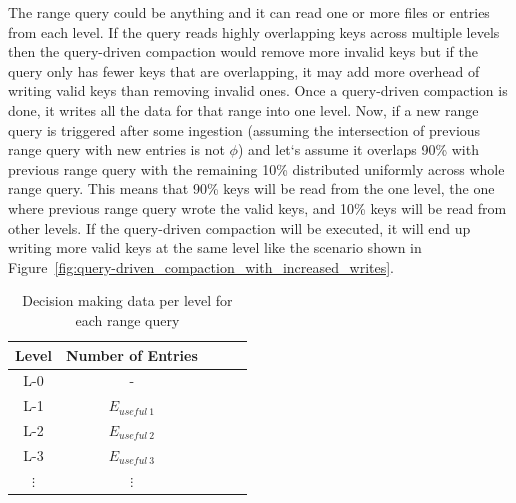 The range query could be anything and it can read one or more files or entries from each level. If the query reads highly
overlapping keys across multiple levels then the query-driven compaction would remove more invalid keys but if the query only 
has fewer keys that are overlapping, it may add more overhead of writing valid keys than removing invalid ones. 
Once a query-driven compaction is done, it writes all the data for that range into one level. Now, if a new range query is 
triggered after some ingestion (assuming the intersection of previous range query with new entries is not $\phi$) and let`s assume it 
overlaps 90\% with previous range query with the remaining 10\% distributed uniformly across whole range query. This means that
90\% keys will be read from the one level, the one where previous range query wrote the valid keys, and 10\% keys will be read 
from other levels. If the query-driven compaction will be executed, it will end up writing more valid keys at the same 
level like the scenario shown in Figure~\ref{fig:query-driven_compaction_with_increased_writes}.



\begin{table}
    \begin{tabular}{|c|c|c|c|c|}
        \hline
        \textbf{Level} & \textbf{Number of Entries} \\
        \hline
        L-0 & \-- \\
        \hline
        L-1 & \textit{$E_{useful\ 1}$} \\
        \hline
        L-2 & \textit{$E_{useful\ 2}$} \\
        \hline
        L-3 & \textit{$E_{useful\ 3}$} \\
        \hline
        $\vdots$ & $\vdots$ \\
        \hline
    \end{tabular}
    \caption{Decision making data per level for each range query}
    \label{table:decision-making-meta-data}
\end{table}

